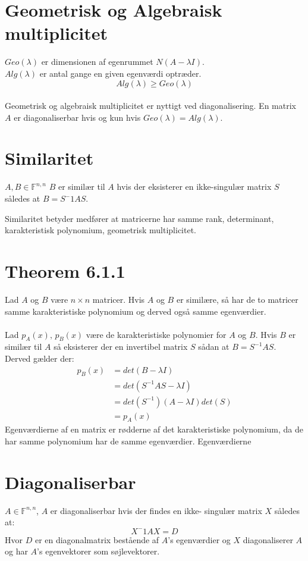 \documentclass[a4paper,oneside,article]{memoir}
\begin{document}
	\section{Geometrisk og Algebraisk multiplicitet}
	$Geo(\lambda)$ er dimensionen af egenrummet $N(A-\lambda I)$.\\
	$Alg(\lambda)$ er antal gange en given egenværdi optræder.\\
	$$Alg(\lambda)\geq Geo(\lambda)$$
	\\
	Geometrisk og algebraisk multiplicitet er nyttigt ved diagonalisering. En
	matrix $A$ er diagonaliserbar hvis og kun hvis $Geo(\lambda)=Alg(\lambda)$.
	
	\section{Similaritet}
	$A,B\in \mathbb{F}^{n,n}$ $B$ er similær til $A$ hvis der eksisterer
	en ikke-singulær matrix $S$ således at $B=S^-1AS$.
	
	Similaritet betyder medfører at matricerne har samme rank, determinant,
	karakteristisk polynomium, geometrisk multiplicitet.
	
	\section{Theorem 6.1.1}
	Lad $A$ og $B$ være $n \times n$ matricer. Hvis $A$ og $B$
	er similære, så har de to matricer samme karakteristiske
	polynomium og derved også samme egenværdier.
	\\
	\\
	Lad $p_A(x),\, p_B(x)$ være de karakteristiske 
	polynomier for $A$ og $B$. Hvis $B$ er similær til $A$
	så eksisterer der en invertibel matrix $S$ sådan
	at $B=S^{-1}AS$. Derved gælder der:
	\begin{align*}
	p_B(x)&=det(B-\lambda I)\\
	&=det(S^{-1}AS-\lambda I)\\
	&=det(S^{-1})(A-\lambda I)det(S)\\
	&=p_A(x)
	\end{align*}
	Egenværdierne af en matrix er rødderne af det karakteristiske
	polynomium, da de har samme polynomium har de samme egenværdier.
	Egenværdierne 
	
	\section{Diagonaliserbar}
	$A\in \mathbb{F}^{n,n}$, $A$ er diagonaliserbar hvis der findes en ikke-
	singulær matrix $X$ således at:
	$$X^-1AX=D$$
	Hvor $D$ er en diagonalmatrix bestående af $A$'s egenværdier og $X$ 
	diagonaliserer $A$ og har $A$'s egenvektorer som søjlevektorer.
	
\end{document}
